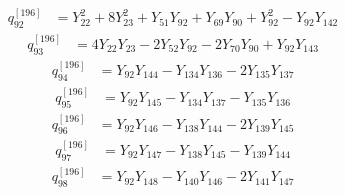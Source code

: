 \begin{equation}\label{q196:row:092}
\begin{aligned}
q_{92}^{[196]} &={} Y_{22}^{2} + 8Y_{23}^{2} + Y_{51}Y_{92} + Y_{69}Y_{90} + Y_{92}^{2} - Y_{92}Y_{142}
\end{aligned}
\end{equation}
\begin{equation}\label{q196:row:093}
\begin{aligned}
q_{93}^{[196]} &={} 4Y_{22}Y_{23} - 2Y_{52}Y_{92} - 2Y_{70}Y_{90} + Y_{92}Y_{143}
\end{aligned}
\end{equation}
\begin{equation}\label{q196:row:094}
\begin{aligned}
q_{94}^{[196]} &={} Y_{92}Y_{144} - Y_{134}Y_{136} - 2Y_{135}Y_{137}
\end{aligned}
\end{equation}
\begin{equation}\label{q196:row:095}
\begin{aligned}
q_{95}^{[196]} &={} Y_{92}Y_{145} - Y_{134}Y_{137} - Y_{135}Y_{136}
\end{aligned}
\end{equation}
\begin{equation}\label{q196:row:096}
\begin{aligned}
q_{96}^{[196]} &={} Y_{92}Y_{146} - Y_{138}Y_{144} - 2Y_{139}Y_{145}
\end{aligned}
\end{equation}
\begin{equation}\label{q196:row:097}
\begin{aligned}
q_{97}^{[196]} &={} Y_{92}Y_{147} - Y_{138}Y_{145} - Y_{139}Y_{144}
\end{aligned}
\end{equation}
\begin{equation}\label{q196:row:098}
\begin{aligned}
q_{98}^{[196]} &={} Y_{92}Y_{148} - Y_{140}Y_{146} - 2Y_{141}Y_{147}
\end{aligned}
\end{equation}
